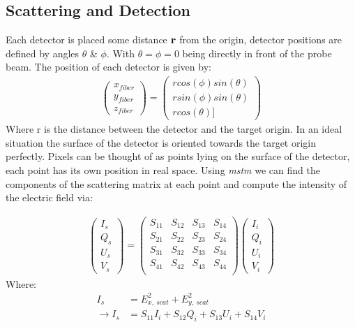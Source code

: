 \subsection{Scattering and Detection}
Each detector is placed some distance $\bf r$ from the origin, 
detector positions are defined by angles $\theta$ \& $\phi$. With 
$\theta=\phi=0$ being directly in front of the probe beam. The 
position of each detector is given by:
\begin{align}
	\begin{pmatrix}
		x_{fiber} \\ y_{fiber} \\ z_{fiber}
	\end{pmatrix} = 
	\begin{pmatrix}
		rcos(\phi)sin(\theta) \\ rsin(\phi)sin(\theta) \\ rcos(\theta)]
	\end{pmatrix}
\end{align}
Where r is the distance between the detector and the target origin. 
In an ideal situation the surface of the detector is oriented towards 
the target origin perfectly. Pixels can be thought of as points lying 
on the surface of the detector, each point has its own position in real
space. Using \textit{mstm} we can find the components of the scattering 
matrix at each point and compute the intensity of the electric field via:

\begin{align}
	\begin{pmatrix}
		I_s \\ Q_s \\ U_s \\ V_s
	\end{pmatrix} = 
	\begin{pmatrix}
		S_{11} & S_{12} & S_{13} & S_{14} \\
		S_{21} & S_{22} & S_{23} & S_{24} \\
		S_{31} & S_{32} & S_{33} & S_{34} \\
		S_{41} & S_{42} & S_{43} & S_{44} \\
	\end{pmatrix}
	\begin{pmatrix}
		I_i \\ Q_i \\ U_i \\ V_i
	\end{pmatrix}
\end{align}
Where:
\begin{align}
	I_s &= E_{x,\ scat}^2+E_{y,\ scat}^2  \label{eq:intensity} 
	\\
	\rightarrow I_s &= S_{11}I_i+S_{12}Q_i+S_{13}U_i+S_{14}V_i
\end{align}

